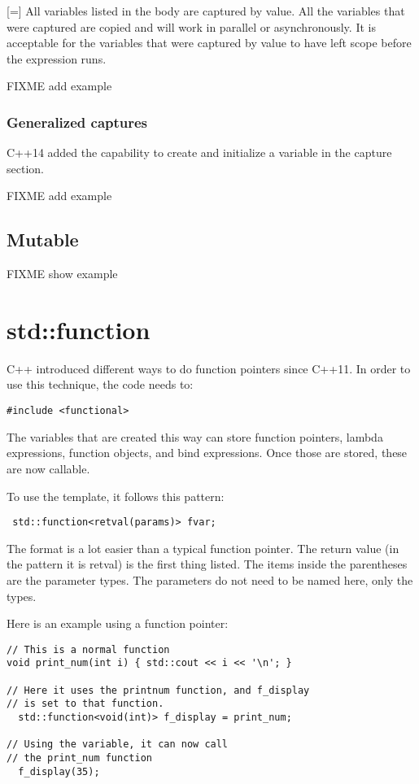 [=] All variables listed in the body are captured by value. All the variables that were captured are copied and will work in parallel or asynchronously. It is acceptable for the variables that were captured by value to have left scope before the expression runs.

FIXME add example
\subsubsection{Generalized captures}
C++14 added the capability to create and initialize a variable in the capture section. 

FIXME add example

\subsection{Mutable}
FIXME show example

\section{std::function}
\label{stdfunction}
C++ introduced different ways to do function pointers since C++11. In order to use this
technique, the code needs to: 
\begin{lstlisting}
#include <functional>
\end{lstlisting}
The variables that are created this way can store function pointers, lambda expressions, 
function objects, and bind expressions. Once those are stored, these are now callable.

To use the template, it follows this pattern:
\begin{verbatim}
 std::function<retval(params)> fvar;    
\end{verbatim}
The format is a lot easier than a typical function pointer. The
return value (in the pattern it is retval) is the first thing listed.
The items inside the parentheses are the parameter types. The parameters
do not need to be named here, only the types.

Here is an example using a function pointer:
\begin{lstlisting}
// This is a normal function
void print_num(int i) { std::cout << i << '\n'; }

// Here it uses the printnum function, and f_display 
// is set to that function.
  std::function<void(int)> f_display = print_num;
  
// Using the variable, it can now call 
// the print_num function
  f_display(35);
\end{lstlisting}

